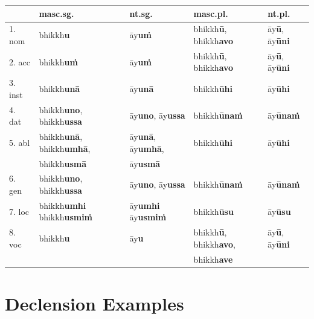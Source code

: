 \documentclass[11pt,oneside]{memoir}
\begin{document}
\begin{center}
\begin{tabular}{lllll}
 & \textbf{masc.sg.} & \textbf{nt.sg.} & \textbf{masc.pl.} & \textbf{nt.pl.}\\[0pt]
\hline
1. nom & bhikkh\textbf{u} & āy\textbf{uṁ} & bhikkh\textbf{ū}, bhikkh\textbf{avo} & āy\textbf{ū}, āy\textbf{ūni}\\[0pt]
2. acc & bhikkh\textbf{uṁ} & āy\textbf{uṁ} & bhikkh\textbf{ū}, bhikkh\textbf{avo} & āy\textbf{ū}, āy\textbf{ūni}\\[0pt]
3. inst & bhikkh\textbf{unā} & āy\textbf{unā} & bhikkh\textbf{ūhi} & āy\textbf{ūhi}\\[0pt]
4. dat & bhikkh\textbf{uno}, bhikkh\textbf{ussa} & āy\textbf{uno}, āy\textbf{ussa} & bhikkh\textbf{ūnaṁ} & āy\textbf{ūnaṁ}\\[0pt]
5. abl & bhikkh\textbf{unā}, bhikkh\textbf{umhā}, & āy\textbf{unā}, āy\textbf{umhā}, & bhikkh\textbf{ūhi} & āy\textbf{ūhi}\\[0pt]
 & bhikkh\textbf{usmā} & āy\textbf{usmā} &  & \\[0pt]
6. gen & bhikkh\textbf{uno}, bhikkh\textbf{ussa} & āy\textbf{uno}, āy\textbf{ussa} & bhikkh\textbf{ūnaṁ} & āy\textbf{ūnaṁ}\\[0pt]
7. loc & bhikkh\textbf{umhi} bhikkh\textbf{usmiṁ} & āy\textbf{umhi} āy\textbf{usmiṁ} & bhikkh\textbf{ūsu} & āy\textbf{ūsu}\\[0pt]
8. voc & bhikkh\textbf{u} & āy\textbf{u} & bhikkh\textbf{ū}, bhikkh\textbf{avo}, & āy\textbf{ū}, āy\textbf{ūni}\\[0pt]
 &  &  & bhikkh\textbf{ave} & \\[0pt]
\end{tabular}
\end{center}

\clearpage

\section{Declension Examples}
\label{sec:org2d0e4d4}
\end{document}
